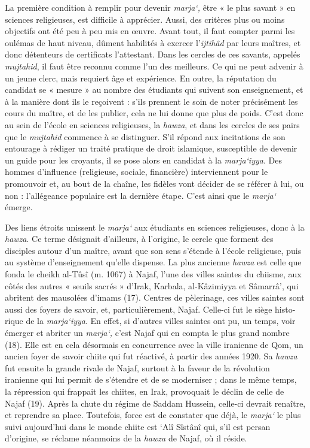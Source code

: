La première condition à remplir pour devenir \emph{marja`,} être « le
plus savant » en sciences religieuses, est difficile à apprécier. Aussi,
des critères plus ou moins objectifs ont été peu à peu mis en œuvre.
Avant tout, il faut compter parmi les oulémas de haut niveau, dûment
habilités à exercer l'\emph{ijtihâd} par leurs maîtres, et donc
détenteurs de certificats l'attestant. Dans les cercles de ces savants,
appelés \emph{mujtahid}, il faut être reconnu comme l'un des meilleurs.
Ce qui ne peut advenir à un jeune clerc, mais requiert âge et
expérience. En outre, la réputation du candidat se « mesure » au nombre
des étudiants qui suivent son enseignement, et à la manière dont ils le
reçoivent : s'ils prennent le soin de noter précisément les cours du
maître, et de les publier, cela ne lui donne que plus de poids. C'est
donc au sein de l'école en sciences religieuses, la \emph{hawza}, et
dans les cercles de ses pairs que le \emph{mujtahid} commence à se
distinguer. S'il répond aux incitations de son entourage à rédiger un
traité pratique de droit islamique, susceptible de devenir un guide pour
les croyants, il se pose alors en candidat à la \emph{marja`iyya}. Des
hommes d'influence (religieuse, sociale, financière) interviennent pour
le promouvoir et, au bout de la chaîne, les fidèles vont décider de se
référer à lui, ou non : l'allégeance populaire est la dernière étape.
C'est ainsi que le \emph{marja`} émerge.

Des liens étroits unissent le \emph{marja`} aux étudiants en sciences
religieuses, donc à la \emph{hawza}. Ce terme désignait d'ailleurs, à
l'origine, le cercle que forment des disciples autour d'un maître, avant
que son sens s'étende à l'école religieuse, puis au système
d'enseignement qu'elle dispense. La plus ancienne \emph{hawza} est celle
que fonda le cheikh al-Tûsî (m. 1067) à Najaf, l'une des villes saintes
du chiisme, aux côtés des autres « seuils sacrés » d'Irak, Karbala,
al-Kâzimiyya et Sâmarrâ', qui abritent des mausolées d'imams (17).
Centres de pèlerinage, ces villes saintes sont aussi des foyers de
savoir, et, particulièrement, Najaf. Celle-ci fut le siège histo- rique
de la \emph{marja`iyya}. En effet, si d'autres villes saintes ont pu, un
temps, voir émerger et abriter un \emph{marja`,} c'est Najaf qui en
compta le plus grand nombre (18). Elle est en cela désormais en
concurrence avec la ville iranienne de Qom, un ancien foyer de savoir
chiite qui fut réactivé, à partir des années 1920. Sa \emph{hawza} fut
ensuite la grande rivale de Najaf, surtout à la faveur de la révolution
iranienne qui lui permit de s'étendre et de se moderniser ; dans le même
temps, la répression qui frappait les chiites, en Irak, provoquait le
déclin de celle de Najaf (19). Après la chute du régime de Saddam
Hussein, celle-ci devrait renaître, et reprendre sa place. Toutefois,
force est de constater que déjà, le \emph{marja`} le plus suivi
aujourd'hui dans le monde chiite est `Alî Sîstânî qui, s'il est persan
d'origine, se réclame néanmoins de la \emph{hawza} de Najaf, où il
réside.

